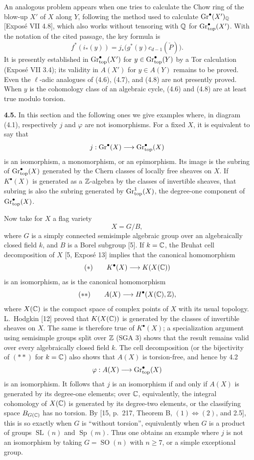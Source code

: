 An analogous problem appears when one tries to calculate the Chow ring of
the blow-up $X'$ of $X$ along $Y$, following the method used to calculate
$\operatorname{Gr}^\bullet(X')_\mathbb Q$ [Exposé VII 4.8], which also works
without tensoring with $\mathbb Q$ for $\operatorname{Gr}_{\mathrm{top}}^\bullet(X')$. With the notation of
the cited passage, the key formula is
\begin{equation}\tag{4.8}
 f^*(i_*(y))=j_*\bigl(g^*(y)c_{d-1}(\check P)\bigr).
\end{equation}
It is presently established in $\operatorname{Gr}_{\mathrm{top}}^\bullet(X')$ for
$y\in\operatorname{Gr}_{\mathrm{top}}^\bullet(Y)$ by a Tor calculation (Exposé VII 3.4); its validity
in $A(X')$ for $y\in A(Y)$ remains to be proved. Even the $\ell$-adic
analogues of (4.6), (4.7), and (4.8) are not presently proved. When $y$ is
the cohomology class of an algebraic cycle, (4.6) and (4.8) are at least
true modulo torsion.

\textbf{4.5.} In this section and the following ones we give examples where,
in diagram (4.1), respectively $j$ and $\varphi$ are not isomorphisms. For
a fixed $X$, it is equivalent to say that
\[
 j:\operatorname{Gr}^\bullet(X)\longrightarrow\operatorname{Gr}_{\mathrm{top}}^\bullet(X)
\]
is an isomorphism, a monomorphism, or an epimorphism. Its image is the
subring of $\operatorname{Gr}_{\mathrm{top}}^\bullet(X)$ generated by the Chern classes of locally free
sheaves on $X$. If $K^\bullet(X)$ is generated as a $\mathbb Z$-algebra by the
classes of invertible sheaves, that subring is also the subring generated
by $\operatorname{Gr}_{\mathrm{top}}^1(X)$, the degree-one component of $\operatorname{Gr}_{\mathrm{top}}^\bullet(X)$.

Now take for $X$ a flag variety
\[
 X=G/B,
\]
where $G$ is a simply connected semisimple algebraic group over an
algebraically closed field $k$, and $B$ is a Borel subgroup [5]. If
$k=\mathbb C$, the Bruhat cell decomposition of $X$ [5, Exposé 13] implies that
the canonical homomorphism
\[
 (*)\qquad K^\bullet(X)\longrightarrow K(X(\mathbb C))
\]
is an isomorphism, as is the canonical homomorphism
\[
 (**)\qquad A(X)\longrightarrow H^\bullet(X(\mathbb C),\mathbb Z),
\]
where $X(\mathbb C)$ is the compact space of complex points of $X$ with its usual
topology. L.~Hodgkin [12] proved that $K(X(\mathbb C))$ is generated by the
classes of invertible sheaves on $X$. The same is therefore true of
$K^\bullet(X)$; a specialization argument using semisimple groups split
over $\mathbb Z$ (SGA 3) shows that the result remains valid over every
algebraically closed field $k$. The cell decomposition (or the bijectivity
of $(**)$ for $k=\mathbb C$) also shows that $A(X)$ is torsion-free, and hence by
4.2
\[
 \varphi:A(X)\longrightarrow\operatorname{Gr}_{\mathrm{top}}^\bullet(X)
\]
is an isomorphism. It follows that $j$ is an isomorphism if and only if
$A(X)$ is generated by its degree-one elements; over $\mathbb C$, equivalently,
the integral cohomology of $X(\mathbb C)$ is generated by its degree-two elements,
or the classifying space $B_{G(\mathbb C)}$ has no torsion. By [15, p.~217,
Theorem B, $(1)\Leftrightarrow(2)$, and 2.5], this is so exactly when $G$ is
``without torsion'', equivalently when $G$ is a product of groups
$\operatorname{SL}(n)$ and $\operatorname{Sp}(m)$. Thus one obtains an
example where $j$ is not an isomorphism by taking $G=\operatorname{SO}(n)$
with $n\geq7$, or a simple exceptional group.


